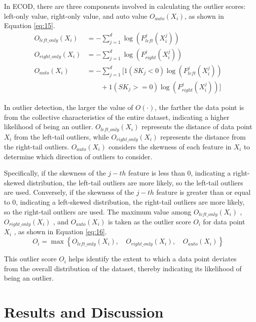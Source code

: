 \documentclass[3p,authoryear,preprint,12pt]{elsarticle}
\begin{document}
In ECOD, there are three components involved in calculating the outlier scores: left-only value, right-only value, and auto value $O_{auto}(X_i)$, as shown in Equation \ref{eq:15}.
\begin{equation}
	\label{eq:15}
	\begin{split}
		O_{left\_only}(X_i) &= - \sum_{j=1}^{d} \log \left( F_{left}^j\left( X_i^j \right) \right) \\
		O_{right\_only}(X_i) &= - \sum_{j=1}^{d} \log \left( F_{right}^j \left( X_i^j \right) \right) \\
		O_{auto}(X_i) &= - \sum_{j=1}^{d} [ 1( SK_j < 0 )\log (F_{left}^j(X_i^j)) \\ & \quad \quad + 1( SK_j >= 0 ) \log (F_{right}^j(X_i^j))]  
	\end{split}
\end{equation}

In outlier detection, the larger the value of $O(\cdot)$, the farther the data point is from the collective characteristics of the entire dataset, indicating a higher likelihood of being an outlier. $O_{left\_only}(X_i)$ represents the distance of data point $X_i$  from the left-tail outliers, while $O_{right\_only}(X_i)$  represents the distance from the right-tail outliers. $O_{auto}(X_i)$ considers the skewness of each feature in $X_i$  to determine which direction of outliers to consider. 

Specifically, if the skewness of the  $j-th$ feature is less than 0, indicating a right-skewed distribution, the left-tail outliers are more likely, so the left-tail outliers are used. Conversely, if the skewness of the  $j-th$ feature is greater than or equal to 0, indicating a left-skewed distribution, the right-tail outliers are more likely, so the right-tail outliers are used. The maximum value among $O_{left\_only}(X_i)$ , $O_{right\_only}(X_i)$ , and $O_{auto}(X_i)$  is taken as the outlier score $O_i$  for data point $X_i$ , as shown in Equation \ref{eq:16}.
\begin{equation}
	\label{eq:16}
	O_i = \max \left\lbrace   O_{left\_only}(X_i), \quad O_{right\_only}(X_i), \quad	O_{auto}(X_i)   \right\rbrace 
\end{equation}

This outlier score $O_i$  helps identify the extent to which a data point deviates from the overall distribution of the dataset, thereby indicating its likelihood of being an outlier.   
\section{Results and Discussion}
\end{document}
